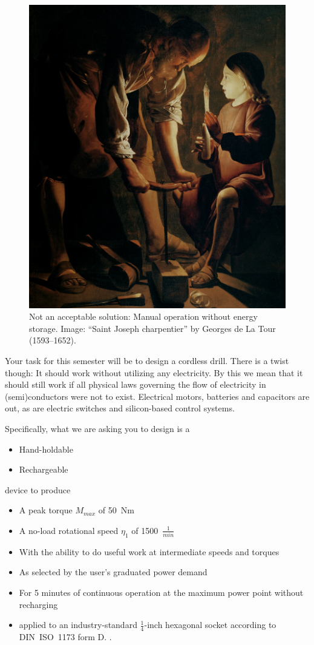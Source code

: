 \documentclass[headinclude=true]{scrartcl}
\begin{document}
\begin{figure}[h!] \centering
 \includegraphics[width=0.5\linewidth]{La_Tour}
 \caption{Not an acceptable solution: Manual operation without energy storage. Image: ``Saint Joseph charpentier'' by Georges de La Tour (1593–1652).}
\end{figure}


Your task for this semester will be to design a cordless drill. There is a twist though: It should work without utilizing any electricity. By this we mean that it should still work if all physical laws governing the flow of electricity in (semi)conductors were not to exist. Electrical motors, batteries and capacitors are out, as are electric switches and silicon-based control systems.

Specifically, what we are asking you to design is a

\begin{itemize}
 \item Hand-holdable
 \item Rechargeable
\end{itemize}

device to produce

\begin{itemize}
 \item A peak torque $M_{max}$ of 50~Nm
 \item A no-load rotational speed $\eta_1$ of 1500~$\frac{1}{min}$
 \item With the ability to do useful work at intermediate speeds and torques
 \item As selected by the user's graduated power demand
 \item For 5 minutes of continuous operation at the maximum power point without recharging
 \item applied to an industry-standard $\frac{1}{4}$-inch hexagonal socket according to DIN~ISO~1173 form D. \cite{DDIN2009}.
\end{itemize}
\end{document}
